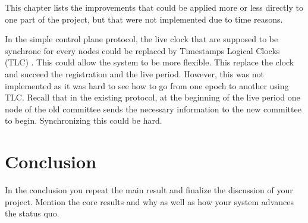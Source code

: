 \documentclass[a4paper,11pt,oneside]{report}
\begin{document}
This chapter lists the improvements that could be applied more or less directly
to one part of the project, but that were not implemented due to time reasons. 

In the simple control plane protocol, the live clock that are supposed to be
synchrone for every nodes could be replaced by Timestamps Logical Clocks (TLC)
\cite{Que-Sera-Consensus}. This could allow the system to be more flexible.
This replace the clock and succeed the registration and the live period.
However, this was not implemented as it was hard to see how to go from one
epoch to another using TLC. Recall that in the existing protocol, at the
beginning of the live period one node of the old committee sends the necessary
information to the new committee to begin. Synchronizing this could be hard.

\chapter{Conclusion}

In the conclusion you repeat the main result and finalize the discussion of
your project. Mention the core results and why as well as how your system
advances the status quo.

\cleardoublepage {} {}
\printbibliography

%
%
\end{document}
